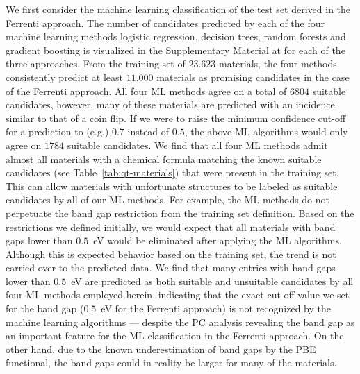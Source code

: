 \documentclass[superscriptaddress,unsortedaddress,
 amsmath,amssymb,
 aps,
]{revtex4-2}
\begin{document}
We first consider the machine learning classification of the test set derived in the Ferrenti approach. The number of candidates predicted by each of the four machine learning methods logistic regression, decision trees, random forests and gradient boosting is visualized in the Supplementary Material at \cite{supplementary} for each of the three approaches. 
From the training set of $23.623$ materials, the four methods consistently predict at least $11.000$ materials as promising candidates in the case of the Ferrenti approach. All four ML methods agree on a total of $6804$ suitable candidates, however, many of these materials are predicted with an incidence similar to that of a coin flip. If we were to raise the minimum confidence cut-off for a prediction to (e.g.) $0.7$ instead of $0.5$, the above ML algorithms would only agree on $1784$ suitable candidates. 
We find that all four ML methods admit almost all materials with a chemical formula matching the known suitable candidates (see  Table~\ref{tab:qt-materials}) that were present in the training set. 
This can allow materials with unfortunate structures to be labeled as suitable candidates by all of our ML methods. 
For example, the ML methods do not perpetuate the band gap restriction from the training set definition. 
Based on the restrictions we defined initially, we would expect that all materials with band gaps lower than $0.5$~eV would be eliminated 
after applying the ML algorithms.  
Although this is expected behavior based on the training set, the trend is not carried over to the predicted data. We find that many entries with band gaps lower than $0.5$~eV are predicted as both suitable and unsuitable candidates by all four ML methods employed herein, 
indicating that the exact cut-off value we set for the band gap ($0.5$~eV for the Ferrenti approach) is not recognized by the machine learning algorithms --- despite the PC analysis revealing the band gap as an important feature for the ML classification in the Ferrenti approach.  
On the other hand, due to the known underestimation of band gaps by the PBE functional, the band gaps could in reality be larger for many of the materials. 
\end{document}
